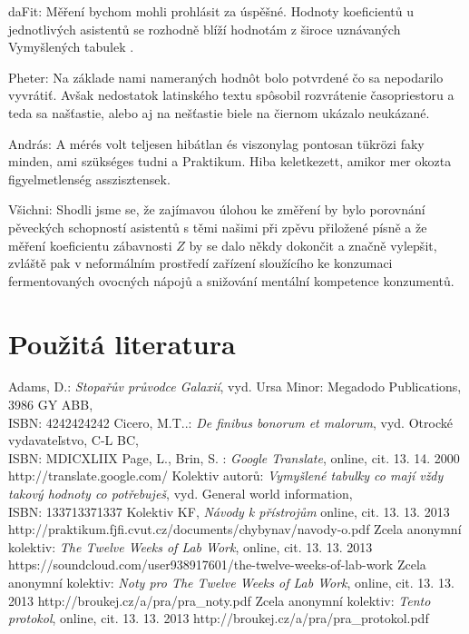 \documentclass[english]{article}
\begin{document}
{\color{dafit}daFit}: Měření bychom mohli prohlásit za úspěšné. Hodnoty koeficientů u jednotlivých asistentů se rozhodně blíží hodnotám z široce uznávaných Vymyšlených tabulek \cite{bib:vymyslene_tabulky}. 

{\color{pheter}Pheter}: Na základe nami nameraných hodnôt bolo potvrdené čo sa nepodarilo vyvrátiť. Avšak nedostatok latinského textu spôsobil rozvrátenie časopriestoru a teda sa našťastie, alebo aj na nešťastie biele na čiernom ukázalo neukázané.

{\color{andras}András}: A mérés volt teljesen hibátlan és viszonylag pontosan tükrözi faky minden, ami szükséges tudni a Praktikum. Hiba keletkezett, amikor mer okozta figyelmetlenség asszisztensek.

{\color{rarek}V\color{kuba}š\color{tonda}i\color{dafit}ch\color{pheter}n\color{andras}i}: 
Shodli jsme se, že zajímavou úlohou ke změření by bylo porovnání pěveckých schopností asistentů s těmi našimi při zpěvu přiložené písně \cite{bib:sound} a že měření koeficientu zábavnosti $Z$ by se dalo někdy dokončit a značně vylepšit, zvláště pak v neformálním prostředí zařízení sloužícího ke konzumaci fermentovaných ovocných nápojů a snižování mentální kompetence konzumentů.

\section{Použitá literatura}
\begin{thebibliography}{9}
 Adams, D.: \textit{Stopařův průvodce Galaxií}, vyd. Ursa Minor:  Megadodo Publications, 3986 GY  ABB, \\ISBN: 4242424242
 Cicero, M.T..: \textit{ De finibus bonorum et malorum}, vyd. Otrocké vydavateľstvo, C-L BC, \\ISBN: MDICXLIIX 
 Page, L., Brin, S. : \textit{Google Translate}, online, cit. 13. 14. 2000
\newline http://translate.google.com/
Kolektiv autorů: \textit{Vymyšlené tabulky co mají vždy takový hodnoty co potřebuješ}, vyd. General world information, \\ISBN: 133713371337  
 Kolektiv KF, \emph{Návody k přístrojům} online, cit. 13. 13. 2013 \newline http://praktikum.fjfi.cvut.cz/documents/chybynav/navody-o.pdf
 Zcela anonymní kolektiv: \textit{The Twelve Weeks of Lab Work}, online, cit. 13. 13. 2013
\newline https://soundcloud.com/user938917601/the-twelve-weeks-of-lab-work
 Zcela anonymní kolektiv: \textit{Noty pro The Twelve Weeks of Lab Work}, online, cit. 13. 13. 2013
\newline http://broukej.cz/a/pra/pra\_noty.pdf
 Zcela anonymní kolektiv: \textit{Tento protokol}, online, cit. 13. 13. 2013
\newline http://broukej.cz/a/pra/pra\_protokol.pdf
\end{thebibliography} 
\end{document}
